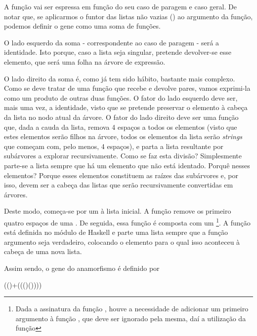 \documentclass[a4paper]{article}
\newcommand{\Varid}[1]{\mathit{#1}}
\def\resethooks{%
  \global\let\SaveRestoreHook\empty
  \global\let\ColumnHook\empty}
\let\hspre\empty
\let\hspost\empty
\begin{document}
A função  vai ser espressa em função do seu caso de paragem e caso geral. De notar que, se aplicarmos o funtor das listas não vazias () ao argumento da função, podemos definir o gene como uma soma de funções.

O lado esquerdo da soma - correspondente ao caso de paragem - será a identidade. Isto porque, caso a lista seja singular, pretende devolver-se esse elemento, que será uma folha na árvore de expressão.

O lado direito da soma é, como já tem sido hábito, bastante mais complexo. Como se deve tratar de uma função que recebe e devolve pares, vamos exprimi-la como um produto de outras duas funções. O fator do lado esquerdo deve ser, mais uma vez, a identidade, visto que se pretende preservar o elemento à cabeça da lista no nodo atual da árvore. O fator do lado direito deve ser uma função que, dada a cauda da lista, remova 4 espaços a todos os elementos (visto que estes elementos serão filhos na árvore, todos os elementos da lista serão \textit{strings} que começam com, pelo menos, 4 espaços), e parta a lista resultante por subárvores a explorar recursivamente. Como se faz esta divisão? Simplesmente parte-se a lista sempre que há um elemento que não está identado. Porquê nesses elementos? Porque esses elementos constituem as raízes das subárvores e, por isso, devem ser a cabeça das listas que serão recursivamente convertidas em árvores.

Deste modo, começa-se por um  à lista inicial. A função  remove os primeiro quatro espaços de uma . De seguida, essa função é composta com um \footnote{Dada a assinatura da função , houve a necessidade de adicionar um primeiro argumento à função , que deve ser ignorado pela mesma, daí a utilização da função }. A função  está definida no módulo de Haskell  e parte uma lista sempre que a função argumento seja verdadeiro, colocando o elemento para o qual isso aconteceu à cabeça de uma nova lista.

Assim sendo, o gene do anamorfismo é definido por

\begin{hscode}\SaveRestoreHook
\column{B}{@{}>{\hspre}l<{\hspost}@{}}%
\column{E}{@{}>{\hspre}l<{\hspost}@{}}%
\>[B]{}\Varid{gene}\mathrel{=}((\Varid{id})+(\Varid{id}\times((\Varid{groupBy}\;\underline{\Varid{canTrim}})\comp (\lambda \Varid{verb}\mid \map \mid \Varid{trim}))))\comp \Varid{out}{}\<[E]%
\ColumnHook
\end{hscode}\resethooks
\end{document}
